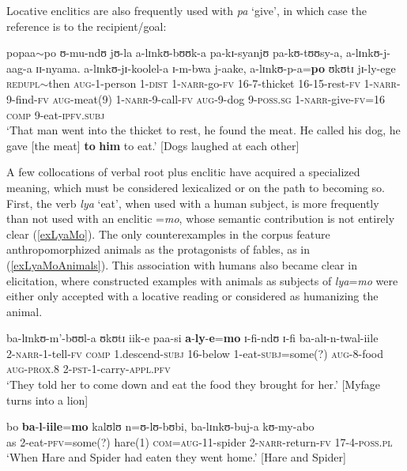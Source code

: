 Locative enclitics are also frequently used with \textit{pa} \lq give', in which case the reference is to the recipient/goal:
\begin{exe}
	\ex \gll popaa$\sim$po ʊ-mu-ndʊ jʊ-la a-lɪnkʊ-bʊʊk-a pa-kɪ-syanjʊ pa-kʊ-tʊʊsy-a, a-lɪnkʊ-j-aag-a ɪɪ-nyama. a-lɪnkʊ-jɪ-koolel-a ɪ-m-bwa j-aake, a-lɪnkʊ-p-a=\textbf{po} ʊkʊtɪ jɪ-ly-ege\\
	\textsc{redupl}$\sim$then \textsc{aug}-1-person 1-\textsc{dist} 1-\textsc{narr}-go-\textsc{fv} 16-7-thicket 16-15-rest-\textsc{fv} 1-\textsc{narr}-9-find-\textsc{fv} \textsc{aug}-meat(9) 1-\textsc{narr}-9-call-\textsc{fv} \textsc{aug}-9-dog 9-\textsc{poss.sg} 1-\textsc{narr}-give-\textsc{fv}=16 \textsc{comp} 9-eat-\textsc{ipfv.subj}\\
	\glt `That man went into the thicket to rest, he found the meat. He called his dog, he gave [the meat] \textbf{to} \textbf{him} to eat.' [Dogs laughed at each other]
\end{exe}

A few collocations of verbal root plus enclitic have acquired a specialized meaning, which must be considered lexicalized or on the path to becoming so. First, the verb \textit{lya} `eat', when used with a human subject, is more frequently than not used with an enclitic \mbox{=\textit{mo}}, whose semantic contribution is not entirely clear (\ref{exLyaMo}). The only counterexamples in the corpus feature anthropomorphized animals as the protagonists of fables, as in (\ref{exLyaMoAnimals}). This association with humans also became clear in elicitation, where constructed examples with animals as subjects of \textit{lya}=\textit{mo} were either only accepted with a locative reading or considered as humanizing the animal.
\begin{exe}
	\ex \label{exLyaMo} 
	\gll ba-lɪnkʊ-m'-bʊʊl-a ʊkʊtɪ iik-e paa-si \textbf{a}-\textbf{ly}-\textbf{e}=\textbf{mo} ɪ-fi-ndʊ ɪ-fi ba-alɪ-n-twal-iile\\
	2-\textsc{narr}-1-tell-\textsc{fv} \textsc{comp} 1.descend-\textsc{subj} 16-below 1-eat-\textsc{subj}=some(?) \textsc{aug}-8-food \textsc{aug}-\textsc{prox.8} 2-\textsc{pst}-1-carry-\textsc{appl.pfv}\\
	\glt \lq They told her to come down and eat the food they brought for her.' [Myfage turns into a lion] 
	
	
	\ex \label{exLyaMoAnimals}\gll bo \textbf{ba}-\textbf{l}-\textbf{iile}=\textbf{mo} kalʊlʊ n=ʊ-lʊ-bʊbi, ba-lɪnkʊ-buj-a kʊ-my-abo\\
	as 2-eat-\textsc{pfv}=some(?) hare(1) \textsc{com}=\textsc{aug}-11-spider 2-\textsc{narr}-return-\textsc{fv} 17-4-\textsc{poss.pl}\\
	\glt `When Hare and Spider had eaten they went home.' [Hare and Spider]
\end{exe}

